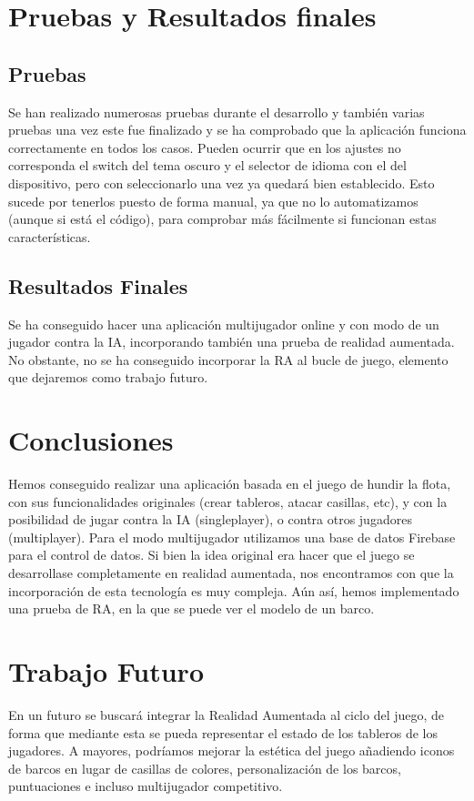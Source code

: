 \documentclass[a4paper, openright, 12pt]{article}
\begin{document}
\section{Pruebas y Resultados finales}
\subsection{Pruebas}
Se han realizado numerosas pruebas durante el desarrollo y también varias pruebas una vez este fue finalizado y se ha comprobado que la aplicación funciona correctamente en todos los casos. Pueden ocurrir que en los ajustes no corresponda el switch del tema oscuro y el selector de idioma con el del dispositivo, pero con seleccionarlo una vez ya quedará bien establecido. Esto sucede por tenerlos puesto de forma manual, ya que no lo automatizamos (aunque si está el código), para comprobar más fácilmente si funcionan estas características.

\subsection{Resultados Finales}
Se ha conseguido hacer una aplicación multijugador online y con modo de un jugador contra la IA, incorporando también una prueba de realidad aumentada. No obstante, no se ha conseguido incorporar la RA al bucle de juego, elemento que dejaremos como trabajo futuro.

\section{Conclusiones}
Hemos conseguido realizar una aplicación basada en el juego de hundir la flota, con sus funcionalidades originales (crear tableros, atacar casillas, etc), y con la posibilidad de jugar contra la IA (singleplayer), o contra otros jugadores (multiplayer). Para el modo multijugador utilizamos una base de datos Firebase para el control de datos. Si bien la idea original era hacer que el juego se desarrollase completamente en realidad aumentada, nos encontramos con que la incorporación de esta tecnología es muy compleja. Aún así, hemos implementado una prueba de RA, en la que se puede ver el modelo de un barco.

\section{Trabajo Futuro}
En un futuro se buscará integrar la Realidad Aumentada al ciclo del juego, de forma que mediante esta se pueda representar el estado de los tableros de los jugadores. A mayores, podríamos mejorar la estética del juego añadiendo iconos de barcos en lugar de casillas de colores, personalización de los barcos, puntuaciones e incluso multijugador competitivo.
\end{document}
